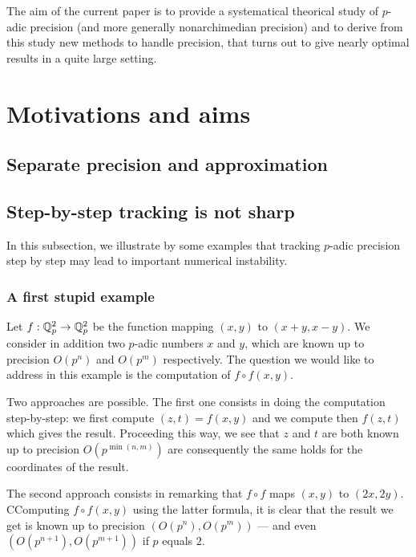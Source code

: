 \documentclass{amsart}
\begin{document}
The aim of the current paper is to provide a systematical theorical 
study of $p$-adic precision (and more generally nonarchimedian 
precision) and to derive from this study new methods to handle 
precision, that turns out to give nearly optimal results in a quite 
large setting.

\section{Motivations and aims}


\subsection{Separate precision and approximation}


\subsection{Step-by-step tracking is not sharp}
\label{ssec:stepbystep}

In this subsection, we illustrate by some examples that tracking
$p$-adic precision step by step may lead to important numerical
instability.

\subsubsection*{A first stupid example}

Let $f : \mathbb Q_p^2 \to \mathbb Q_p^2$ be the function mapping $(x,y)$ to $(x+y, 
x-y)$. We consider in addition two $p$-adic numbers $x$ and $y$, 
which are known up to precision $O(p^n)$ and $O(p^m)$ respectively.
The question we would like to address in this example is the
computation of $f \circ f(x,y)$.

Two approaches are possible. The first one consists in doing the 
computation step-by-step: we first compute $(z,t) = f(x,y)$ and we 
compute then $f(z,t)$ which gives the result. Proceeding this way, we 
see that $z$ and $t$ are both known up to precision $O(p^{\min(n,m)})$ 
are consequently the same holds for the coordinates of the result.

The second approach consists in remarking that $f \circ f$ maps
$(x,y)$ to $(2x, 2y)$. CComputing $f \circ f(x,y)$ using the latter
formula, it is clear that the result we get is known up to precision
$(O(p^n), O(p^m))$ --- and even $(O(p^{n+1}), O(p^{m+1}))$ if $p$
equals $2$.
\end{document}
